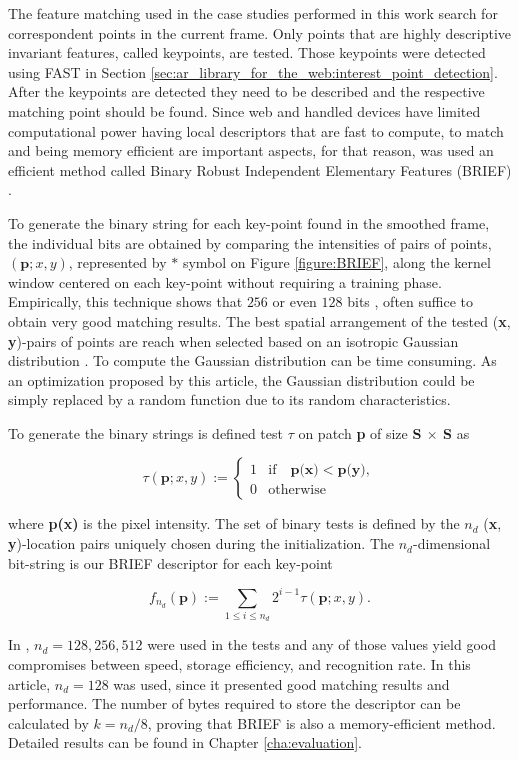 The feature matching used in the case studies performed in this work search for correspondent points in the current frame. Only points that are highly descriptive invariant features, called keypoints, are tested. Those keypoints were detected using FAST \cite{Rosten2010} in Section \ref{sec:ar_library_for_the_web:interest_point_detection}. After the keypoints are detected they need to be described and the respective matching point should be found. Since web and handled devices have limited computational power having local descriptors that are fast to compute, to match and being memory efficient are important aspects, for that reason, was used an efficient method called Binary Robust Independent Elementary Features (BRIEF) \cite{Calonder2010}.

To generate the binary string for each key-point found in the smoothed frame, the individual bits are obtained by comparing the intensities of pairs of points, $(\textbf{p}; x, y)$, represented by $\ast$ symbol on Figure \ref{figure:BRIEF}, along the kernel window centered on each key-point without requiring a training phase.
Empirically, this technique shows that $256$ or even $128$ bits \cite{Calonder2010}, often suffice to obtain very good matching results. The best spatial arrangement of the tested (\textbf{x}, \textbf{y})-pairs of points are reach when selected based on an isotropic Gaussian distribution \cite{Calonder2010}. To compute the Gaussian distribution can be time consuming. As an optimization proposed by this article, the Gaussian distribution could be simply replaced by a random function due to its random characteristics.

To generate the binary strings is defined test $\tau$ on patch \textbf{p} of size \textbf{S $\times$ S} as

$$\tau(\textbf{p}; x, y) :=
\begin{cases}
  1 &\mbox{if}\quad \textbf{p(x)} < \textbf{p(y)},\\
  0 &\mbox{otherwise}
\end{cases}$$

where \textbf{p(x)} is the pixel intensity. The set of binary tests is defined by the $n_{d}$ (\textbf{x}, \textbf{y})-location pairs uniquely chosen during the initialization. The $n_{d}$-dimensional bit-string is our BRIEF descriptor for each key-point

$$f_{n_{d}}(\textbf{p}) := \sum_{1 \le i \le n_{d}} 2^{i-1} \tau(\textbf{p}; x, y).$$

In \cite{Calonder2010}, $n_{d}= 128, 256, 512$ were used in the tests and any of those values yield good compromises between speed, storage efficiency, and recognition rate. In this article, $n_{d}= 128$ was used, since it presented good matching results and performance. The number of bytes required to store the descriptor can be calculated by $k = n_{d}/8$, proving that BRIEF is also a memory-efficient method. Detailed results can be found in Chapter \ref{cha:evaluation}.

